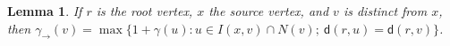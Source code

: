\documentclass[a4paper]{article}
\newcommand{\dist}[2]{\mathsf{d}\left(#1,#2\right)}
\newcommand{\coverP}[2]{S_{#1}\left(#2\right)}
\newcommand{\pathseta}[3]{\mathcal{P}_{\searrow}^{#1}\left(#2,#3\right)}
\newtheorem{lemma}[theorem]{Lemma}
\begin{document}




 

\begin{lemma}\label{lem:gamma-rightarrow}
  If $r$ is the root vertex, $x$ the source vertex, and $v$ is
  distinct from $x$, then
  $\gamma_{\rightarrow}(v) = \max \{ 1+\gamma(u) : u\in I(x,v) \cap
  N(v);\ \dist{r}{u}=\dist{r}{v} \}$.
\end{lemma}
\end{document}

